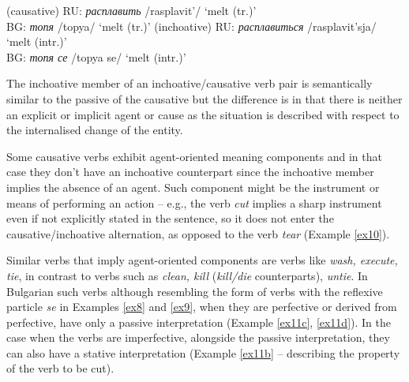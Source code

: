 \documentclass[output=paper,colorlinks,citecolor=brown]{langscibook}
\begin{document}
 \begin{exe}
 \ex \label{ex9}
     \begin{xlist}
         \ex \label{ex9a} (causative) RU: \textit{расплавить} /rasplavit'/ `melt (tr.)' \\
		BG: \textit{топя} /topya/ `melt (tr.)'
         \ex \label{ex9b} (inchoative) RU: \textit{расплавиться} /rasplavit'sja/ `melt (intr.)' \\
		BG: \textit{топя се} /topya se/ `melt (intr.)'
     \end{xlist}
\end{exe}

The inchoative member of an inchoative/causative verb pair is semantically similar to the passive of the causative but the difference is in that there is neither an explicit or implicit agent or cause as the situation is described with respect to the internalised change of the entity.

Some causative verbs exhibit agent-oriented meaning components and in that case they don’t have an inchoative counterpart since the inchoative member implies the absence of an agent. Such component might be the instrument or means of performing an action -- e.g., the verb \textit{cut} implies a sharp instrument even if not explicitly stated in the sentence, so it does not enter the causative/inchoative alternation, as opposed to the verb \textit{tear} (Example \ref{ex10}).

 \begin{exe}
 \ex \label{ex10}
     \begin{xlist}
     \end{xlist}
\end{exe}

 Similar verbs that imply agent-oriented components are verbs like \textit{wash, execute, tie}, in contrast to verbs such as \textit{clean, kill} (\textit{kill/die} counterparts), \textit{untie}. In Bulgarian such verbs although resembling the form of verbs with the reflexive particle \textit{se} in Examples \ref{ex8} and \ref{ex9}, when they are perfective or derived from perfective, have only a passive interpretation (Example  \ref{ex11c}, \ref{ex11d}). In the case when the verbs are imperfective, alongside the passive interpretation, they can also have a stative interpretation (Example \ref{ex11b} -- describing the property of the verb to be cut).
\end{document}
